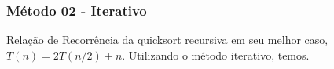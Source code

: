 \subsubsection{Método 02 - Iterativo}
Relação de Recorrência da quicksort recursiva em seu melhor caso, $T(n) = 2T(n/2) + n$. Utilizando o método iterativo, temos.
